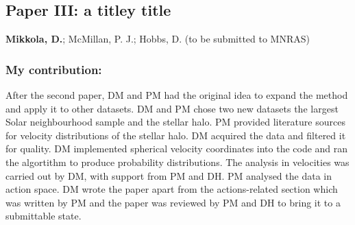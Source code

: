 \subsection*{Paper III: a titley title}
\textbf{Mikkola, D.}; McMillan, P. J.; Hobbs, D. (to be submitted to MNRAS) \newline

\subsubsection*{My contribution:}
After the second paper, DM and PM had the original idea to expand the method and apply it to other datasets. DM and PM chose two new datasets the largest Solar neighbourhood sample and the stellar halo. PM provided literature sources for velocity distributions of the stellar halo. DM acquired the data and filtered it for quality. DM implemented spherical velocity coordinates into the code and ran the algortithm to produce probability distributions. The analysis in velocities was carried out by DM, with support from PM and DH. PM analysed the data in action space. DM wrote the paper apart from the actions-related section which was written by PM and the paper was reviewed by PM and DH to bring it to a submittable state.





